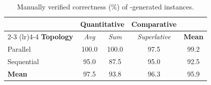 

\begin{table}[t!]
\centering
\small
\setlength{\tabcolsep}{0.55em}
\renewcommand{\arraystretch}{1.2}
\begin{tabular}{l ccc c}
\toprule
& \multicolumn{2}{c}{\textbf{Quantitative}} & \textbf{Comparative} & \\
\cmidrule(lr){2-3} \cmidrule(lr){4-4}
\textbf{Topology} & \textit{Avg} & \textit{Sum} & \textit{Superlative} & \textbf{Mean} \\
\midrule
Parallel    & 100.0 & 100.0 & 97.5 & 99.2 \\
Sequential  &  95.0 &  87.5 & 95.0 & 92.5 \\
\midrule
\textbf{Mean} & 97.5 & 93.8 & 96.3 & 95.9 \\
\bottomrule
\end{tabular}
\caption{Manually verified correctness (\%) of \name-generated instances.}
\label{tab:correctness}
\end{table}